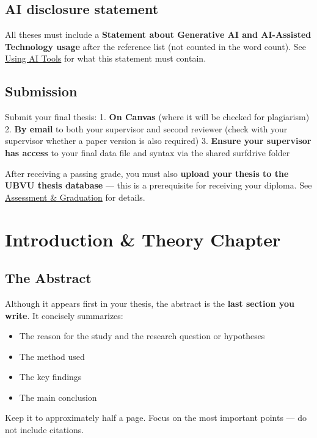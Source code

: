 \documentclass[
  11pt,
  a4paper,
]{scrbook}
\providecommand{\tightlist}{%
  \setlength{\itemsep}{0pt}\setlength{\parskip}{0pt}}\usepackage{longtable,booktabs,array}
\begin{document}
\section{AI disclosure statement}\label{ai-disclosure-statement}

All theses must include a \textbf{Statement about Generative AI and
AI-Assisted Technology usage} after the reference list (not counted in
the word count). See \href{ai-tools.qmd}{Using AI Tools} for what this
statement must contain.

\section{Submission}\label{submission}

Submit your final thesis: 1. \textbf{On Canvas} (where it will be
checked for plagiarism) 2. \textbf{By email} to both your supervisor and
second reviewer (check with your supervisor whether a paper version is
also required) 3. \textbf{Ensure your supervisor has access} to your
final data file and syntax via the shared surfdrive folder

After receiving a passing grade, you must also \textbf{upload your
thesis to the UBVU thesis database} --- this is a prerequisite for
receiving your diploma. See \href{assessment.qmd}{Assessment \&
Graduation} for details.

\chapter{Introduction \& Theory
Chapter}\label{introduction-theory-chapter}

\section{The Abstract}\label{the-abstract}

Although it appears first in your thesis, the abstract is the
\textbf{last section you write}. It concisely summarizes:

\begin{itemize}
\tightlist
\item
  The reason for the study and the research question or hypotheses
\item
  The method used
\item
  The key findings
\item
  The main conclusion
\end{itemize}

Keep it to approximately half a page. Focus on the most important points
--- do not include citations.
\end{document}
